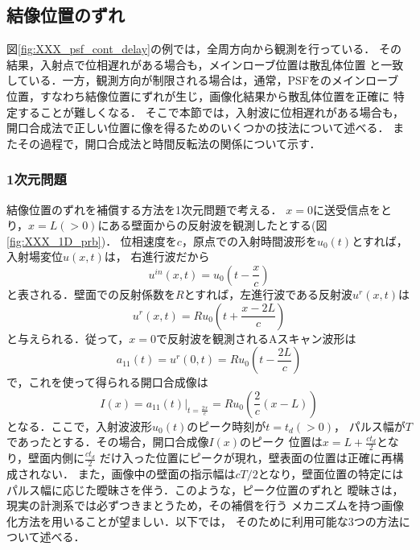 \subsection{結像位置のずれ}
図\ref{fig:XXX_psf_cont_delay}の例では，全周方向から観測を行っている．
その結果，入射点で位相遅れがある場合も，メインローブ位置は散乱体位置
と一致している．一方，観測方向が制限される場合は，通常，PSFをのメインローブ
位置，すなわち結像位置にずれが生じ，画像化結果から散乱体位置を正確に
特定することが難しくなる． そこで本節では，入射波に位相遅れがある場合も，
開口合成法で正しい位置に像を得るためのいくつかの技法について述べる．
またその過程で，開口合成法と時間反転法の関係について示す．
\subsubsection{1次元問題}
結像位置のずれを補償する方法を1次元問題で考える．
$x=0$に送受信点をとり，$x=L(>0)$にある壁面からの反射波を観測したとする(図\ref{fig:XXX_1D_prb})．
位相速度を$c$，原点での入射時間波形を$u_0(t)$とすれば，入射場変位$u(x,t)$は，
右進行波だから
\begin{equation}
	u^{in}(x,t)=u_0\left(t-\frac{x}{c}\right)
	\label{eqn:XXX_uin_1D}
\end{equation}
と表される．壁面での反射係数を$R$とすれば，左進行波である反射波$u^r(x,t)$は
\begin{equation}
	u^{r}(x,t)=Ru_0\left(t+\frac{x-2L}{c}\right)
	\label{eqn:XXX_ur_1D}
\end{equation}
と与えられる．従って，$x=0$で反射波を観測されるAスキャン波形は
\begin{equation}
	a_{11}(t)=u^{r}(0,t)=Ru_0\left( t-\frac{2L}{c}\right)
	\label{eqn:XXX_12}
\end{equation}
で，これを使って得られる開口合成像は
\begin{equation}
	I(x)=
	\left. a_{11}\left(t\right)
	\right|_{t=\frac{2x}{c}}
	=
	Ru_0\left(\frac{2}{c}(x-L)\right)
	\label{eqn:XXX_13}
\end{equation}
となる．ここで，入射波波形$u_0(t)$のピーク時刻が$t=t_d(>0)$，
パルス幅が$T$であったとする．その場合，開口合成像$I(x)$のピーク
位置は$x=L+\frac{ct_d}{2}$となり，壁面内側に$\frac{ct_d}{2}$
だけ入った位置にピークが現れ，壁表面の位置は正確に再構成されない．
また，画像中の壁面の指示幅は$cT/2$となり，壁面位置の特定には
パルス幅に応じた曖昧さを伴う．このような，ピーク位置のずれと
曖昧さは，現実の計測系では必ずつきまとうため，その補償を行う
メカニズムを持つ画像化方法を用いることが望ましい．以下では，
そのために利用可能な3つの方法について述べる．
